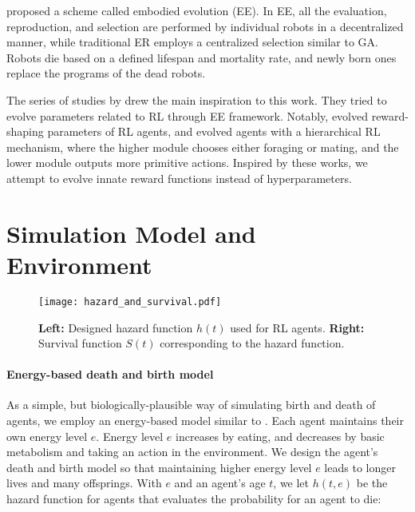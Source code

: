 proposed a scheme called embodied evolution (EE). In EE, all the evaluation, reproduction, and selection are performed by individual robots in a decentralized manner, while traditional ER employs a centralized selection similar to GA\@. Robots die based on a defined lifespan and mortality rate, and newly born ones replace the programs of the dead robots.

The series of studies by \citet{elfwingBiologicallyInspiredEmbodied2005,elfwingDarwinianEmbodiedEvolution2011a,elfwingEmergencePolymorphicMating2014} drew the main inspiration to this work. They tried to evolve parameters related to RL through EE framework. Notably, \citet{elfwingDarwinianEmbodiedEvolution2011a} evolved reward-shaping parameters of RL agents, and \citet{elfwingEmergencePolymorphicMating2014} evolved agents with a hierarchical RL mechanism, where the higher module chooses either foraging or mating, and the lower module outputs more primitive actions. Inspired by these works, we attempt to evolve innate reward functions instead of hyperparameters.

\section{Simulation Model and Environment}\label{sec:method}

\begin{figure}[t]
  \centering{}
  \texttt{[image: hazard\_and\_survival.pdf]}
  \caption{
    \textbf{Left:} Designed hazard function $h(t)$ used for RL agents.
    \textbf{Right:} Survival function $S(t)$ corresponding to the hazard function.
  }\label{figure:hs}
\end{figure}

\paragraph{Energy-based death and birth model}
As a simple, but biologically-plausible way of simulating birth and death of agents, we employ an energy-based model similar to \citet{hamonEcoevolutionaryDynamicsNonepisodic2023}. Each agent maintains their own energy level $e$. Energy level $e$ increases by eating, and decreases by basic metabolism and taking an action in the environment. We design the agent's death and birth model so that maintaining higher energy level $e$ leads to longer lives and many offsprings. With $e$ and an agent's age $t$, we let $h(t, e)$ be the hazard function for agents that evaluates the probability for an agent to die:

